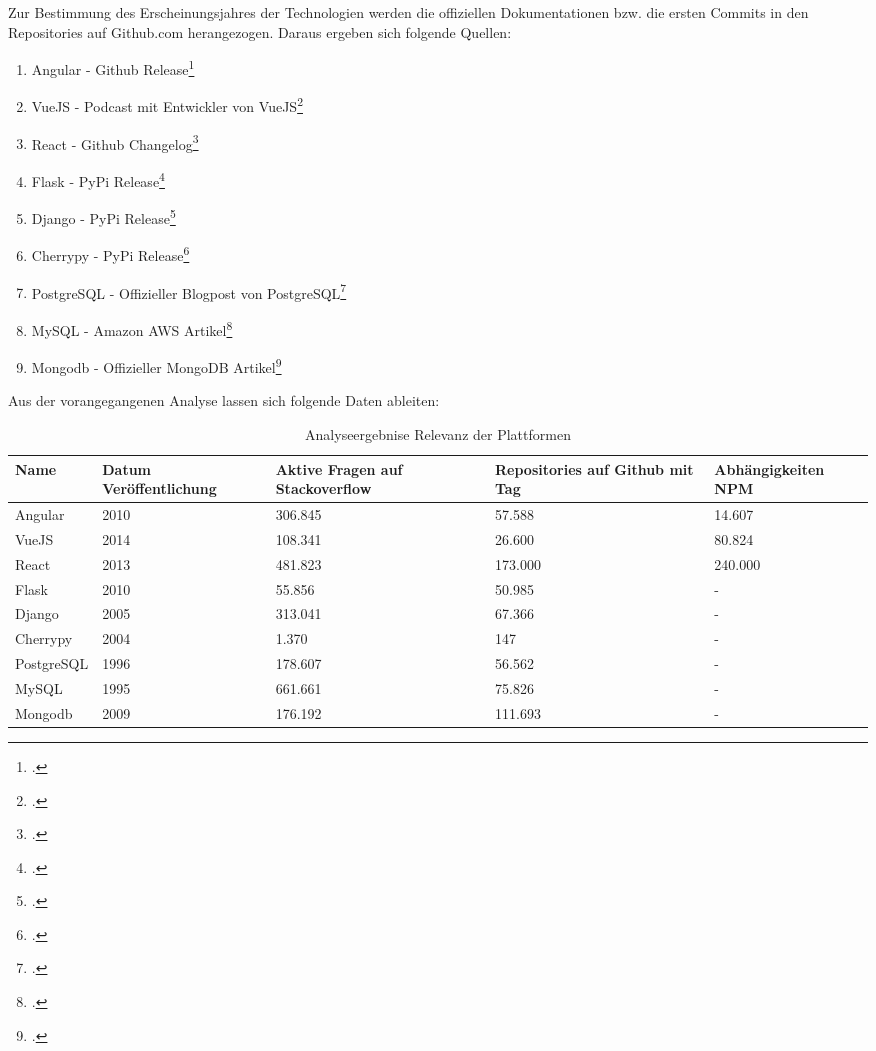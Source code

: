 Zur Bestimmung des Erscheinungsjahres der Technologien werden die offiziellen Dokumentationen bzw. die ersten Commits in den Repositories auf Github.com herangezogen.
Daraus ergeben sich folgende Quellen:
\begin{enumerate}
    \item Angular - Github Release\footcite{githubAngularReleaseV090}
    \item VueJS - Podcast mit Entwickler von VueJS\footcite{eggheadEvanYou}
    \item React - Github Changelog\footcite{githubReactCHANGELOG}
    \item Flask - PyPi Release\footcite{pypiFlask}
    \item Django - PyPi Release\footcite{pypiDjango}
    \item Cherrypy - PyPi Release\footcite{pypiCherryPy}
    \item PostgreSQL - Offizieller Blogpost von PostgreSQL\footcite{postgresqlHappyBirthday}
    \item MySQL - Amazon AWS Artikel\footcite{amazonWhatMySQL}
    \item Mongodb - Offizieller MongoDB Artikel\footcite{mongodbMongoDBEvolved}
\end{enumerate}

\newpage
Aus der vorangegangenen Analyse lassen sich folgende Daten ableiten:

\begin{table}[h!]
    \centering
    \begin{tabular}{|l|p{2cm}|p{3cm}|p{3cm}|p{3cm}|}
        \hline
        \rowcolor{lightgray} Name & \textbf{Datum Veröffentlichung} & \textbf{Aktive Fragen auf Stackoverflow} & \textbf{Repositories auf Github mit Tag} & \textbf{Abhängigkeiten NPM} \\ \hline
        Angular & 2010 & 306.845 & 57.588 & 14.607 \\ \hline
        VueJS & 2014 & 108.341 & 26.600 & 80.824 \\ \hline
        React & 2013 & 481.823 & 173.000 & 240.000 \\ \hline
        \hline
        Flask & 2010 & 55.856 & 50.985 & - \\ \hline
        Django & 2005 & 313.041 & 67.366 & - \\ \hline
        Cherrypy & 2004 & 1.370 & 147 & - \\ \hline
        \hline
        PostgreSQL & 1996 & 178.607 & 56.562 & - \\ \hline
        MySQL & 1995 & 661.661 & 75.826 & - \\ \hline
        Mongodb & 2009 & 176.192 & 111.693 & - \\ \hline
    \end{tabular}
    \caption{Analyseergebnise Relevanz der Plattformen}\label{tab:Analyseergebnise Relevanz der Plattformen}
\end{table}

